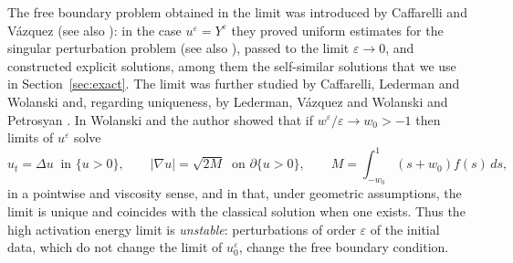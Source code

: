 \documentclass[11pt]{amsart}
\theoremstyle{remark}
\newcommand{\ve}{\varepsilon}
\begin{document}
The free boundary problem obtained in the limit was introduced by Caffarelli
and V\'azquez \cite{CaffarelliVazquez1995} (see also \cite{Vazquez1996}): in
the case $u^\ve=Y^\ve$ they proved uniform estimates for the
singular perturbation problem (see also \cite{Caffarelli1995Lipschitz}), passed to the limit $\ve\to0$, and constructed
explicit solutions, among them the self-similar solutions that we use in
Section~\ref{sec:exact}. The limit was further studied by Caffarelli, Lederman and Wolanski
\cite{CaffarelliLedermanWolanski1997a,CaffarelliLedermanWolanski1997b} and, regarding uniqueness, by Lederman, V\'azquez and
Wolanski \cite{LedermanVazquezWolanski2001} and Petrosyan \cite{Petrosyan2002}. In
\cite{FernandezBonderWolanski2000} Wolanski and the author showed that if
$w^\ve/\ve\to w_0>-1$ then limits of $u^\ve$ solve
\begin{equation}\label{eq:P}\tag{$P$}
u_t=\Delta u\ \text{ in }\{u>0\},\qquad |\nabla u|=\sqrt{2M}\ \text{ on }\partial\{u>0\},\qquad
M=\int_{-w_0}^1(s+w_0)f(s)\,ds,
\end{equation}
in a pointwise and viscosity sense, and in \cite{FernandezBonderWolanski2004} that, under
geometric assumptions, the limit is unique and coincides with the classical
solution when one exists. Thus the high activation energy limit is
\emph{unstable}: perturbations of order $\ve$ of the initial data, which do
not change the limit of $u^\ve_0$, change the free boundary condition.
\end{document}
